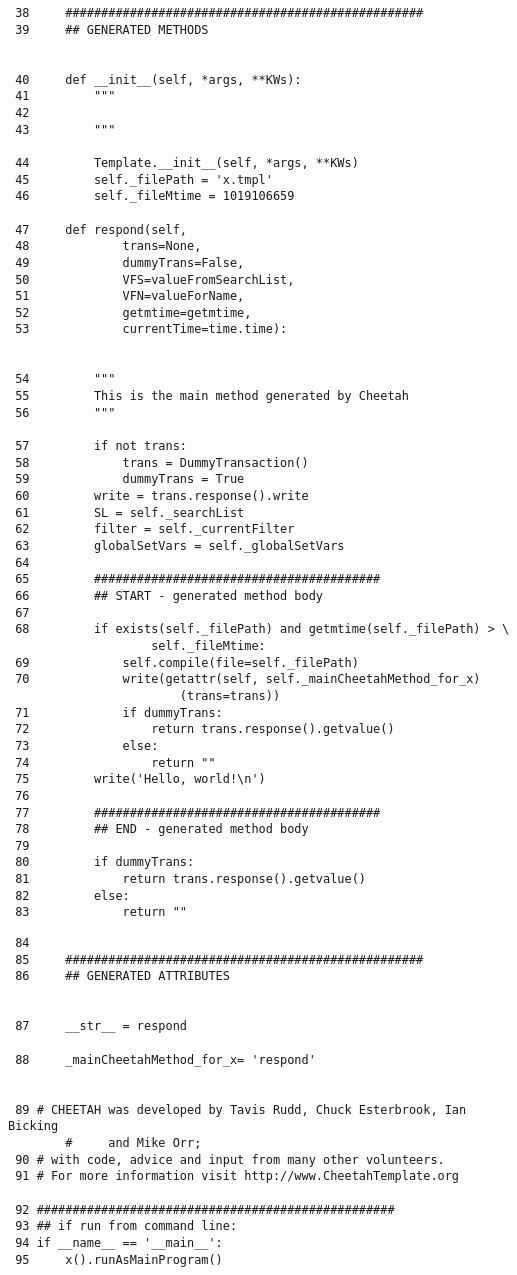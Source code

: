 \begin{verbatim}
 38	    ##################################################
 39	    ## GENERATED METHODS
    
    
 40	    def __init__(self, *args, **KWs):
 41	        """
 42	        
 43	        """
    
 44	        Template.__init__(self, *args, **KWs)
 45	        self._filePath = 'x.tmpl'
 46	        self._fileMtime = 1019106659
    
 47	    def respond(self,
 48	            trans=None,
 49	            dummyTrans=False,
 50	            VFS=valueFromSearchList,
 51	            VFN=valueForName,
 52	            getmtime=getmtime,
 53	            currentTime=time.time):
    
    
 54	        """
 55	        This is the main method generated by Cheetah
 56	        """
    
 57	        if not trans:
 58	            trans = DummyTransaction()
 59	            dummyTrans = True
 60	        write = trans.response().write
 61	        SL = self._searchList
 62	        filter = self._currentFilter
 63	        globalSetVars = self._globalSetVars
 64	        
 65	        ########################################
 66	        ## START - generated method body
 67	        
 68	        if exists(self._filePath) and getmtime(self._filePath) > \
                    self._fileMtime:
 69	            self.compile(file=self._filePath)
 70	            write(getattr(self, self._mainCheetahMethod_for_x)
                        (trans=trans))
 71	            if dummyTrans:
 72	                return trans.response().getvalue()
 73	            else:
 74	                return ""
 75	        write('Hello, world!\n')
 76	        
 77	        ########################################
 78	        ## END - generated method body
 79	        
 80	        if dummyTrans:
 81	            return trans.response().getvalue()
 82	        else:
 83	            return ""
\end{verbatim}
\begin{verbatim}
 84	        
 85	    ##################################################
 86	    ## GENERATED ATTRIBUTES
    
    
 87	    __str__ = respond
    
 88	    _mainCheetahMethod_for_x= 'respond'
    
    
 89	# CHEETAH was developed by Tavis Rudd, Chuck Esterbrook, Ian Bicking 
        #     and Mike Orr;
 90	# with code, advice and input from many other volunteers.
 91	# For more information visit http://www.CheetahTemplate.org
    
 92	##################################################
 93	## if run from command line:
 94	if __name__ == '__main__':
 95	    x().runAsMainProgram()
    
\end{verbatim}

